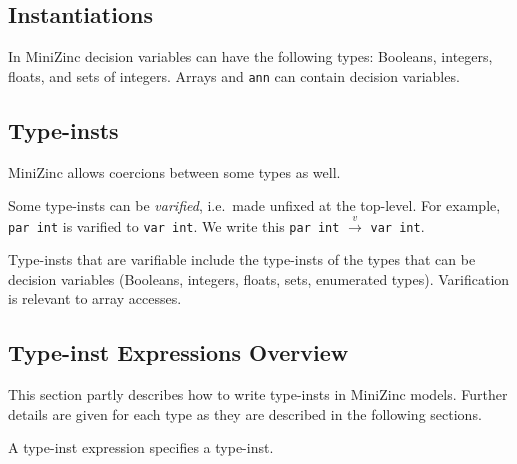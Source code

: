 \documentclass[10pt]{scrartcl}
\newcommand{\varify}[2]{#1 $\stackrel{v}{\rightarrow}$ #2}
\begin{document}
\subsection{Instantiations}
     \label{Instantiations}

In MiniZinc decision variables can have the following types: Booleans,
integers, floats, and sets of integers. %
Arrays and \texttt{ann} can contain decision variables.

\subsection{Type-insts}
     \label{Type-insts}
\CommonTypeInstDescription{}
MiniZinc allows coercions between some types as well.

Some type-insts can be \emph{varified}, i.e.~made unfixed at the top-level.
For example, \texttt{par int} is varified to \texttt{var int}.  We write this
\varify{\texttt{par int}}{\texttt{var int}}.

Type-insts that are varifiable include the type-insts of the types that can
be decision variables (Booleans, integers, floats, sets, enumerated types).
Varification is relevant to %
array accesses.

\subsection{Type-inst Expressions Overview}
     \label{Type-inst Expressions Overview}
This section partly describes how to write type-insts in MiniZinc models.
Further details are given for each type as they are described in the
following sections.

A type-inst expression specifies a type-inst.
\end{document}
